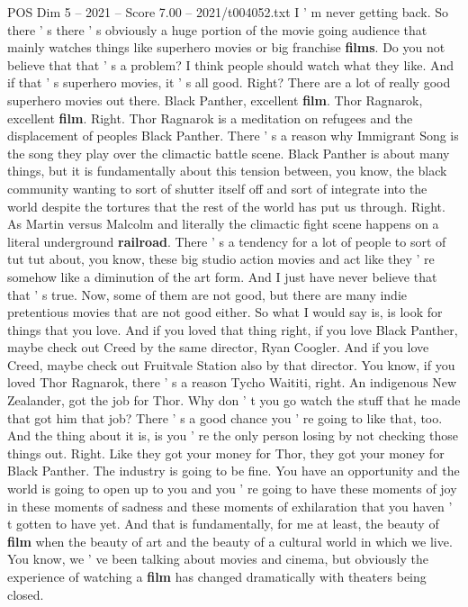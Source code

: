 \begin{textsample}{POS Dim 5 – 2021 – Score 7.00 – 2021/t004052.txt}
I ' m never getting back.
So there ' s there ' s obviously a huge portion of the movie going audience that mainly watches things like superhero movies or big franchise \textbf{films}.
Do you not believe that that ' s a problem?
I think people should watch what they like.
And if that ' s superhero movies, it ' s all good.
Right?
There are a lot of really good superhero movies out there.
Black Panther, excellent \textbf{film}.
Thor Ragnarok, excellent \textbf{film}.
Right.
Thor Ragnarok is a meditation on refugees and the displacement of peoples Black Panther.
There ' s a reason why Immigrant Song is the song they play over the climactic battle scene.
Black Panther is about many things, but it is fundamentally about this tension between, you know, the black community wanting to sort of shutter itself off and sort of integrate into the world despite the tortures that the rest of the world has put us through.
Right.
As Martin versus Malcolm and literally the climactic fight scene happens on a literal underground \textbf{railroad}.
There ' s a tendency for a lot of people to sort of tut tut about, you know, these big studio action movies and act like they ' re somehow like a diminution of the art form.
And I just have never believe that that ' s true.
Now, some of them are not good, but there are many indie pretentious movies that are not good either.
So what I would say is, is look for things that you love.
And if you loved that thing right, if you love Black Panther, maybe check out Creed by the same director, Ryan Coogler.
And if you love Creed, maybe check out Fruitvale Station also by that director.
You know, if you loved Thor Ragnarok, there ' s a reason Tycho Waititi, right.
An indigenous New Zealander, got the job for Thor.
Why don ' t you go watch the stuff that he made that got him that job?
There ' s a good chance you ' re going to like that, too.
And the thing about it is, is you ' re the only person losing by not checking those things out.
Right.
Like they got your money for Thor, they got your money for Black Panther.
The industry is going to be fine.
You have an opportunity and the world is going to open up to you and you ' re going to have these moments of joy in these moments of sadness and these moments of exhilaration that you haven ' t gotten to have yet.
And that is fundamentally, for me at least, the beauty of \textbf{film} when the beauty of art and the beauty of a cultural world in which we live.
You know, we ' ve been talking about movies and cinema, but obviously the experience of watching a \textbf{film} has changed dramatically with theaters being closed.

\end{textsample}
